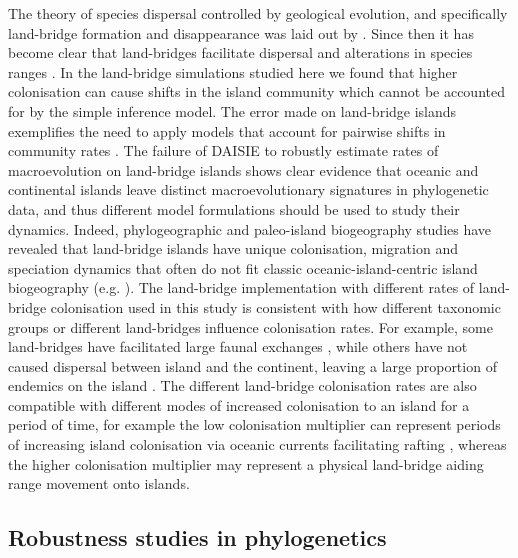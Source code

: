 \documentclass{article}
\begin{document}
The theory of species dispersal controlled by geological evolution, and specifically land-bridge formation and disappearance was laid out by \cite{simpson_mammals_1940}. Since then it has become clear that land-bridges facilitate dispersal and alterations in species ranges \citep{wilcox_supersaturated_1978}. In the land-bridge simulations studied here we found that higher colonisation can cause shifts in the island community which cannot be accounted for by the simple inference model. The error made on land-bridge islands exemplifies the need to apply models that account for pairwise shifts in community rates \citep{hauffe_lake_2020}. The failure of DAISIE to robustly estimate rates of macroevolution on land-bridge islands shows clear evidence that oceanic and continental islands leave distinct macroevolutionary signatures in phylogenetic data, and thus different model formulations should be used to study their dynamics. Indeed, phylogeographic and paleo-island biogeography studies have revealed that land-bridge islands have unique colonisation, migration and speciation dynamics that often do not fit classic oceanic-island-centric island biogeography (e.g. \cite{papadopoulou_genomic_2015, hammoud_past_2021}). The land-bridge implementation with different rates of land-bridge colonisation used in this study is consistent with how different taxonomic groups or different land-bridges influence colonisation rates. For example, some land-bridges have facilitated large faunal exchanges \citep{odea_formation_2016}, while others have not caused dispersal between island and the continent, leaving a large proportion of endemics on the island \citep{reuter_role_2021}. The different land-bridge colonisation rates are also compatible with different modes of increased colonisation to an island for a period of time, for example the low colonisation multiplier can represent periods of increasing island colonisation via oceanic currents facilitating rafting \citep{ali_mammalian_2010}, whereas the higher colonisation multiplier may represent a physical land-bridge aiding range movement onto islands. 

\subsection*{Robustness studies in phylogenetics}
\end{document}

